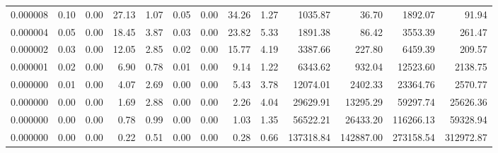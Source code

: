\begin{tabular}{lrrrrrrrrrrrr}
0.000008 & 0.10 & 0.00 & 27.13 & 1.07 & 0.05 & 0.00 & 34.26 & 1.27 & 1035.87 & 36.70 & 1892.07 & 91.94 \\
0.000004 & 0.05 & 0.00 & 18.45 & 3.87 & 0.03 & 0.00 & 23.82 & 5.33 & 1891.38 & 86.42 & 3553.39 & 261.47 \\
0.000002 & 0.03 & 0.00 & 12.05 & 2.85 & 0.02 & 0.00 & 15.77 & 4.19 & 3387.66 & 227.80 & 6459.39 & 209.57 \\
0.000001 & 0.02 & 0.00 & 6.90 & 0.78 & 0.01 & 0.00 & 9.14 & 1.22 & 6343.62 & 932.04 & 12523.60 & 2138.75 \\
0.000000 & 0.01 & 0.00 & 4.07 & 2.69 & 0.00 & 0.00 & 5.43 & 3.78 & 12074.01 & 2402.33 & 23364.76 & 2570.77 \\
0.000000 & 0.00 & 0.00 & 1.69 & 2.88 & 0.00 & 0.00 & 2.26 & 4.04 & 29629.91 & 13295.29 & 59297.74 & 25626.36 \\
0.000000 & 0.00 & 0.00 & 0.78 & 0.99 & 0.00 & 0.00 & 1.03 & 1.35 & 56522.21 & 26433.20 & 116266.13 & 59328.94 \\
0.000000 & 0.00 & 0.00 & 0.22 & 0.51 & 0.00 & 0.00 & 0.28 & 0.66 & 137318.84 & 142887.00 & 273158.54 & 312972.87 \\
\bottomrule
\end{tabular}
